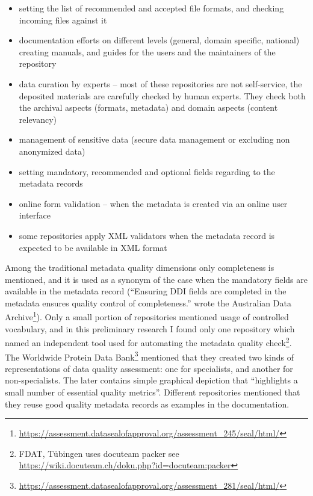 \begin{itemize}
  \setlength{\parskip}{0pt}
  \setlength{\itemsep}{0pt plus 1pt}
  \item setting the list of recommended and accepted file formats, and checking incoming files against it
  \item documentation efforts on different levels (general, domain specific, national) creating manuals, and guides for the users and the maintainers of the repository
  \item data curation by experts -- most of these repositories are not self-service, the deposited materials are carefully checked by human experts. They check both the archival aspects (formats, metadata) and domain aspects (content relevancy)
  \item management of sensitive data (secure data management or excluding non anonymized data)
  \item setting mandatory, recommended and optional fields regarding to the metadata records
  \item online form validation -- when the metadata is created via an online user interface
  \item some repositories apply XML validators when the metadata record is expected to be available in XML format
\end{itemize}

Among the traditional metadata quality dimensions only completeness is mentioned, and it is used as a synonym of the case when the mandatory fields are available in the metadata record (``Ensuring DDI fields are completed in the metadata ensures quality control of completeness.'' wrote the Australian Data Archive\footnote{\url{https://assessment.datasealofapproval.org/assessment_245/seal/html/}}). Only a small portion of repositories mentioned usage of controlled vocabulary, and in this preliminary research I found only one repository which named an independent tool used for automating the metadata quality check\footnote{FDAT, Tübingen uses docuteam packer see \url{https://wiki.docuteam.ch/doku.php?id=docuteam:packer}}. The Worldwide Protein Data Bank\footnote{\url{https://assessment.datasealofapproval.org/assessment_281/seal/html/}} mentioned that they created two kinds of representations of data quality assessment: one for specialists, and another for non-specialists. The later contains simple graphical depiction that ``highlights a small number of essential quality metrics''. Different repositories mentioned that they reuse good quality metadata records as examples in the documentation.

